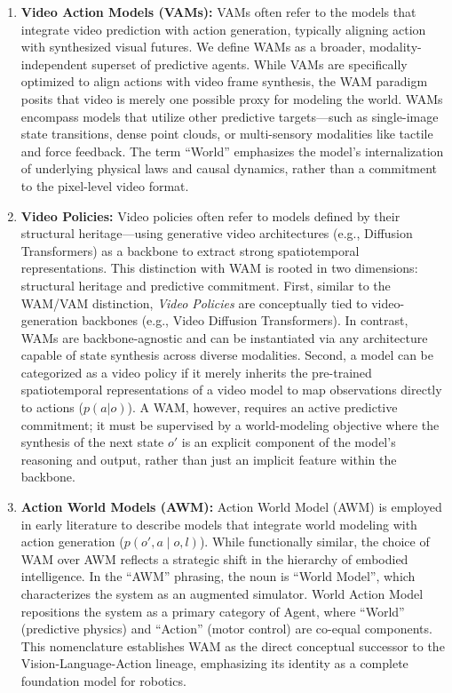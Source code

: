 \begin{enumerate}
    \item \textbf{Video Action Models (VAMs):} 
    VAMs often refer to the models that integrate video prediction with action generation, typically aligning action with synthesized visual futures.
    We define WAMs as a broader, modality-independent superset of predictive agents. While VAMs are specifically optimized to align actions with video frame synthesis, the WAM paradigm posits that video is merely one possible proxy for modeling the world. WAMs encompass models that utilize other predictive targets—such as single-image state transitions, dense point clouds, or multi-sensory modalities like tactile and force feedback. The term ``World'' emphasizes the model's internalization of underlying physical laws and causal dynamics, rather than a commitment to the pixel-level video format.

    \item \textbf{Video Policies:} Video policies often refer to models defined by their structural heritage—using generative video architectures (e.g., Diffusion Transformers) as a backbone to extract strong spatiotemporal representations. This distinction with WAM is rooted in two dimensions: structural heritage and predictive commitment. First, similar to the WAM/VAM distinction, \textit{Video Policies} are conceptually tied to video-generation backbones (e.g., Video Diffusion Transformers). In contrast, WAMs are backbone-agnostic and can be instantiated via any architecture capable of state synthesis across diverse modalities. Second, a model can be categorized as a video policy if it merely inherits the pre-trained spatiotemporal representations of a video model to map observations directly to actions ($p\left( a | o \right)$). A WAM, however, requires an active predictive commitment; it must be supervised by a world-modeling objective where the synthesis of the next state $o'$ is an explicit component of the model's reasoning and output, rather than just an implicit feature within the backbone. 
    
    
    \item \textbf{Action World Models (AWM):} 
    Action World Model (AWM) is employed in early literature to describe models that integrate world modeling with action generation ($p(o', a \mid o, l)$). 
    While functionally similar, the choice of WAM over AWM reflects a strategic shift in the hierarchy of embodied intelligence. In the ``AWM'' phrasing, the noun is ``World Model'', which characterizes the system as an augmented simulator. World Action Model repositions the system as a primary category of Agent, where ``World'' (predictive physics) and ``Action'' (motor control) are co-equal components. This nomenclature establishes WAM as the direct conceptual successor to the Vision-Language-Action lineage, emphasizing its identity as a complete foundation model for robotics.
\end{enumerate}

